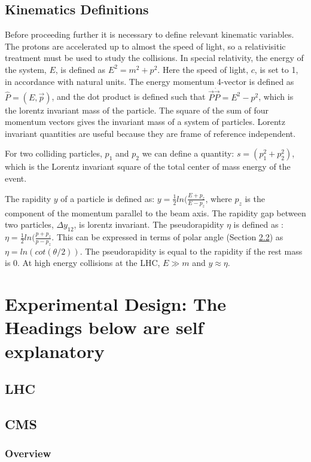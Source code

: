 \documentclass[oneside, letterpaper, oldfontcommands]{memoir}
\begin{document}
\section{Kinematics Definitions}\label{kindef}
\qquad Before proceeding further it is necessary to define relevant kinematic variables. The protons are accelerated up to almost the speed of light, so a relativisitic treatment must be used to study the collisions.   In special relativity, the energy of the system, $E$, is defined as $E^{2} = m^{2}+p^{2}$. Here the speed of light, $c$, is set to 1, in accordance with natural units. The energy momentum 4-vector is defined as $ \hat{P} = (E, \vec{p})$, and the dot product is defined such that $\vec{P} \dot \vec{P} = E^{2}-p^{2}$, which is the lorentz invariant mass of the particle. The square of the sum of four momentum vectors gives the invariant mass of a system of particles. Lorentz invariant quantities are useful because they are frame of reference independent. 

\qquad For two colliding particles, $p_{1}$ and $p_{2}$ we can define a quantity: $s = (p_{1}^2+p_{2}^2)$, which is the Lorentz invariant square of the total center of mass energy of the event.

\qquad The rapidity $y$ of a particle is defined as: $y = \frac{1}{2}ln(\frac{E+p_{z}}{E-p_{z}}$, where $p_{z}$ is the component of the momentum parallel to the beam axis. The rapidity gap between two particles, $\Delta y_{12}$, is lorentz invariant. The pseudorapidity $\eta$ is defined as : $\eta = \frac{1}{2}ln(\frac{p+p_{z}}{p-p_{z}}$. This can be expressed in terms of polar angle (Section \ref{cms}) as $\eta = ln(cot(\theta /2))$. The pseudorapidity is equal to the rapidity if the rest mass is 0. At high energy collisions at the LHC, $E \gg m$ and $y \approx \eta$.

\chapter{Experimental Design: The Headings below are self explanatory}\label{experiment}

\section{LHC}\label{lhc}
\section{CMS}\label{cms}
\subsection{Overview}
\end{document}
